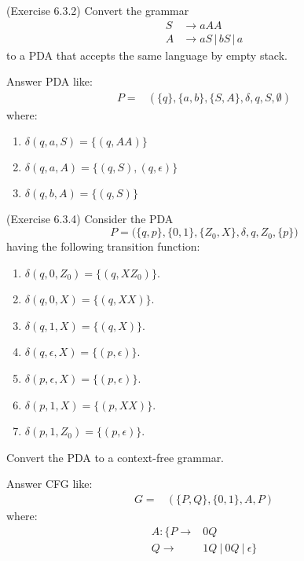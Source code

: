 \documentclass[10pt]{homework}
\begin{document}
\begin{problem} (Exercise 6.3.2)
  Convert the grammar
  \begin{align*}
    S & \rightarrow aAA\\
    A & \rightarrow aS \,|\, bS \,|\, a
  \end{align*}
  to a PDA that accepts the same language by empty stack.
\end{problem}

\begin{solution}
    Answer PDA like:
    \begin{align}
        P=&\left( \{q\},\{a,b\},\{S,A\},\delta,q,S,\emptyset \right) \nonumber
    \end{align}
    where:
    \begin{enumerate}
        \item $\delta\left( q,a,S \right) =\{\left( q,AA \right) \}$ 
        \item $\delta\left( q,a,A \right) =\{\left( q,S \right) ,\left( q,\epsilon \right) \}$ 
        \item $\delta\left( q,b,A \right) =\{\left( q,S \right) \}$
    \end{enumerate}
\end{solution}

\begin{problem} (Exercise 6.3.4)
  Consider the PDA
  \begin{equation*}
    P = \bigl( \{q, p\}, \{0, 1\}, \{Z_{0}, X\}, \delta, q, Z_{0}, \{p\} \bigr)
  \end{equation*}
  having the following transition function:
  \begin{enumerate}
    \item $\delta(q, 0, Z_{0}) = \{(q, XZ_{0})\}$.
    \item $\delta(q, 0, X) = \{(q, XX)\}$.
    \item $\delta(q, 1, X) = \{(q, X)\}$.
    \item $\delta(q, \epsilon, X) = \{(p, \epsilon)\}$.
    \item $\delta(p, \epsilon, X) = \{(p, \epsilon)\}$.
    \item $\delta(p, 1, X) = \{(p, XX)\}$.
    \item $\delta(p, 1, Z_{0}) = \{(p, \epsilon)\}$.
  \end{enumerate}
  Convert the PDA to a context-free grammar.
\end{problem}

\begin{solution}
    Answer CFG like:
    \begin{align}
        G=&\left( \{P,Q\},\{0,1\},A,P \right) \nonumber
    \end{align}
    where:
    \begin{align}
        A:\{P\rightarrow& 0Q\nonumber\\
        Q\rightarrow &1Q\ |\ 0Q\ |\ \epsilon\}\nonumber
    \end{align}
\end{solution}
\end{document}
